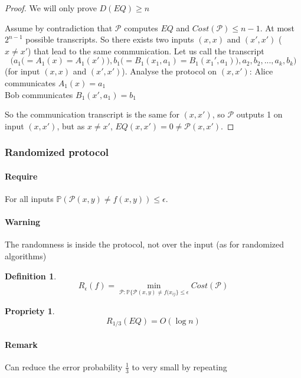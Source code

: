 \documentclass{article}
\newtheorem{prop}{Propriety}
\newtheorem{defi}{Definition}
\begin{document}
\begin{proof} We will only prove $D(EQ)\geq n$

Assume by contradiction that $\mathcal{P}$ computes $EQ$ and $Cost(\mathcal{P})\leq n-1$. At most $2^{n-1}$ possible transcripts. So there exists two inputs $(x,x)$ and $(x',x')$ ($x\neq x'$) that lead to the same communication.
Let us call the transcript 
\[\Big(a_1 \big(=A_1(x)=A_1(x')\big),b_1\big(=B_1(x_1,a_1)=B_1(x_1',a_1)\big), a_2,b_2,...,a_k,b_k \Big)\]
(for input $(x,x)$ and $(x',x')$). Analyse the protocol on $(x,x')$:
Alice communicates $A_1(x)=a_1$\\
Bob communicates $B_1(x',a_1)=b_1$

So the communication transcript is the same for $(x,x')$, so $\mathcal{P}$ outputs 1 on input $(x,x')$, but as $x\neq x'$, $EQ(x,x')=0\neq \mathcal{P}(x,x')$.
\end{proof}




\subsubsection*{Randomized protocol}
\paragraph{Require}
For all inputs $\mathbb{P}(\mathcal{P}(x,y)\neq f(x,y))\leq \epsilon$.
\paragraph{Warning} The randomness is inside the protocol, not over the input (as for randomized algorithms)

\begin{defi}
\[R_\epsilon (f) = \min_{\mathcal{P}:\mathbb{P}\{ \mathcal{P}(x,y)\neq f(x_{ij}\} \leq \epsilon } Cost(\mathcal{P})\]
\end{defi}

\begin{prop}
\[R_{1/3}(EQ)=O(\log n)\]
\end{prop}

\paragraph{Remark} Can reduce the error probability $\frac{1}{3}$ to very small by repeating
\end{document}
